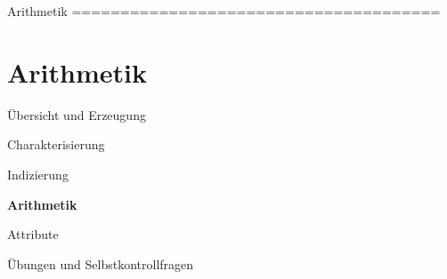 \documentclass[
  8pt,
  ignorenonframetext,
]{beamer}
\begin{document}
\begin{frame}[plain]{Arithmetik ======================================}
\protect\hypertarget{arithmetik}{}
\AtBeginSection{}
\section{Arithmetik}

\large
{}
\vfill

Übersicht und Erzeugung

Charakterisierung

Indizierung

\textbf{Arithmetik}

Attribute

Übungen und Selbstkontrollfragen
\end{frame}
\end{document}
